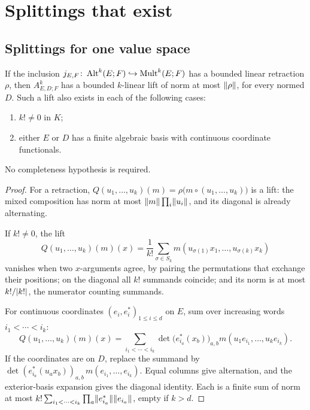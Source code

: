 \section{Splittings that exist}\label{sec:positive}

\subsection{Splittings for one value space}\label{spl:ssec:one-value}

\begin{proposition}\label{prop:split-lift}
If the inclusion $j_{E,F}\colon\operatorname{Alt}^k(E;F)\hookrightarrow\operatorname{Mult}^k(E;F)$ has a bounded linear retraction $\rho$, then $A^k_{E,D;F}$ has a bounded $k$-linear lift of norm at most $\lVert \rho\rVert$, for every normed $D$. Such a lift also exists in each of the following cases:
\begin{enumerate}
\item $k!\ne0$ in $K$;
\item either $E$ or $D$ has a finite algebraic basis with continuous coordinate functionals.
\end{enumerate}
No completeness hypothesis is required.
\end{proposition}
\begin{proof}
For a retraction, $Q(u_1,\ldots,u_k)(m)=\rho\bigl(m\circ(u_1,\ldots,u_k)\bigr)$ is a lift: the mixed composition has
norm at most $\lVert m\rVert\prod_i\lVert u_i\rVert$, and its diagonal is already alternating.

If $k!\ne0$, the lift
\[
 Q(u_1,\ldots,u_k)(m)(x)
 =\frac1{k!}\sum_{\sigma\in S_k}
 m(u_{\sigma(1)}x_1,\ldots,u_{\sigma(k)}x_k)
\]
vanishes when two $x$-arguments agree, by pairing the permutations that exchange their positions; on the diagonal all
$k!$ summands coincide; and its norm is at most $k!/\lvert k!\rvert$, the numerator counting summands.

For continuous coordinates $(e_i,e^*_i)_{1\le i\le d}$ on $E$, sum over increasing words $i_1<\cdots<i_k$:
\[
 Q(u_1,\ldots,u_k)(m)(x)
 =\sum_{i_1<\cdots<i_k}\det\bigl(e^*_{i_a}(x_b)\bigr)_{a,b}
       m(u_1e_{i_1},\ldots,u_ke_{i_k}).
\]
If the coordinates are on $D$, replace the summand by $\det(e^*_{i_a}(u_ax_b))_{a,b}\,m(e_{i_1},\ldots,e_{i_k})$. Equal
columns give alternation, and the exterior-basis expansion gives the diagonal identity. Each is a finite sum of norm at
most $k!\sum_{i_1<\cdots<i_k}\prod_a\lVert e^*_{i_a}\rVert\lVert e_{i_a}\rVert$, empty if $k>d$.
\end{proof}

